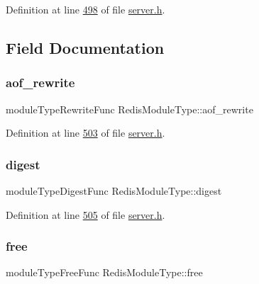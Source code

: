 Definition at line \hyperlink{server_8h_source_l00498}{498} of file \hyperlink{server_8h_source}{server.\+h}.



\subsection{Field Documentation}
\mbox{\label{structRedisModuleType_aa2bd171443a23132fea790e3a7b584a7}} 
\subsubsection{\texorpdfstring{aof\+\_\+rewrite}{aof\_rewrite}}
{\footnotesize\ttfamily module\+Type\+Rewrite\+Func Redis\+Module\+Type\+::aof\+\_\+rewrite}



Definition at line \hyperlink{server_8h_source_l00503}{503} of file \hyperlink{server_8h_source}{server.\+h}.

\mbox{\label{structRedisModuleType_ad90362907e3d6e2d3f9bcc4536f3b8c7}} 
\subsubsection{\texorpdfstring{digest}{digest}}
{\footnotesize\ttfamily module\+Type\+Digest\+Func Redis\+Module\+Type\+::digest}



Definition at line \hyperlink{server_8h_source_l00505}{505} of file \hyperlink{server_8h_source}{server.\+h}.

\mbox{\label{structRedisModuleType_ad8790381b96825ff1ae3201b2942b2e1}} 
\subsubsection{\texorpdfstring{free}{free}}
{\footnotesize\ttfamily module\+Type\+Free\+Func Redis\+Module\+Type\+::free}



